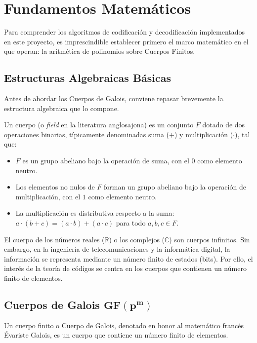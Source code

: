 \chapter{Fundamentos Matemáticos}
\label{ch:fundamentos}

Para comprender los algoritmos de codificación y decodificación implementados en este proyecto, es imprescindible establecer primero el marco matemático en el que operan: la aritmética de polinomios sobre Cuerpos Finitos.

\section{Estructuras Algebraicas Básicas}

Antes de abordar los Cuerpos de Galois, conviene repasar brevemente la estructura algebraica que lo compone.


\begin{definicion}[Cuerpo]
Un cuerpo (o \textit{field} en la literatura anglosajona) es un conjunto $F$ dotado de dos operaciones binarias, típicamente denominadas suma ($+$) y multiplicación ($\cdot$), tal que:
\begin{itemize}
    \item $F$ es un grupo abeliano bajo la operación de suma, con el $0$ como elemento neutro.
    \item Los elementos no nulos de $F$ forman un grupo abeliano bajo la operación de multiplicación, con el $1$ como elemento neutro.
    \item La multiplicación es distributiva respecto a la suma: $a \cdot (b + c) = (a \cdot b) + (a \cdot c)$ para todo $a, b, c \in F$.
\end{itemize}
\end{definicion}

El cuerpo de los números reales ($\mathbb{R}$) o los complejos ($\mathbb{C}$) son cuerpos infinitos. Sin embargo, en la ingeniería de telecomunicaciones y la informática digital, la información se representa mediante un número finito de estados (bits). Por ello, el interés de la teoría de códigos se centra en los cuerpos que contienen un número finito de elementos.

\section{Cuerpos de Galois $\mathbf{GF(p^m)}$}

Un cuerpo finito o Cuerpo de Galois, denotado en honor al matemático francés Évariste Galois, es un cuerpo que contiene un número finito de elementos. 

